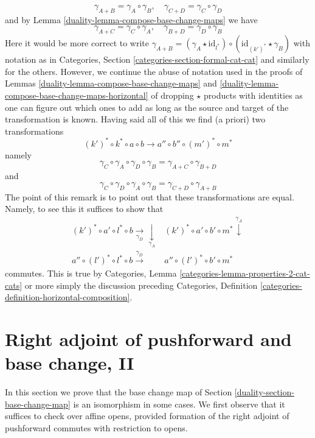 \begin{remark}
$$
\gamma_{A + B} = \gamma_A \circ \gamma_B, \quad
\gamma_{C + D} = \gamma_C \circ \gamma_D
$$
and by Lemma \ref{duality-lemma-compose-base-change-maps} we have
$$
\gamma_{A + C} = \gamma_C \circ \gamma_A, \quad
\gamma_{B + D} = \gamma_D \circ \gamma_B
$$
Here it would be more correct to write
$\gamma_{A + B} = (\gamma_A \star \text{id}_{l^*}) \circ
(\text{id}_{(k')^*} \star \gamma_B)$ with notation as in
Categories, Section \ref{categories-section-formal-cat-cat}
and similarly for the others. However, we continue the
abuse of notation used in the proofs of
Lemmas \ref{duality-lemma-compose-base-change-maps} and
\ref{duality-lemma-compose-base-change-maps-horizontal}
of dropping $\star$ products with identities as one can figure
out which ones to add as long as the source and target of the
transformation is known.
Having said all of this we find (a priori) two transformations
$$
(k')^* \circ k^* \circ a \circ b
\longrightarrow
a'' \circ b'' \circ (m')^* \circ m^*
$$
namely
$$
\gamma_C \circ \gamma_A \circ \gamma_D \circ \gamma_B =
\gamma_{A + C} \circ \gamma_{B + D}
$$
and
$$
\gamma_C \circ \gamma_D \circ \gamma_A \circ \gamma_B =
\gamma_{C + D} \circ \gamma_{A + B}
$$
The point of this remark is to point out that these transformations
are equal. Namely, to see this it suffices to show that
$$
\begin{array}{cc}(k')^* \circ a' \circ l^* \circ b \underset{\gamma_D}{\longrightarrow}\underset{\gamma_A}{\downarrow} & (k')^* \circ a' \circ b' \circ m^* \overset{\gamma_A}{\downarrow} \\ a'' \circ (l')^* \circ l^* \circ b \overset{\gamma_D}{\longrightarrow} & a'' \circ (l')^* \circ b' \circ m^*\end{array}
$$
commutes. This is true by
Categories, Lemma \ref{categories-lemma-properties-2-cat-cats}
or more simply the discussion preceding
Categories, Definition \ref{categories-definition-horizontal-composition}.
\end{remark}

\section{Right adjoint of pushforward and base change, II}
\label{duality-section-base-change-II}
In this section we prove that the base change map of
Section \ref{duality-section-base-change-map} is an isomorphism
in some cases. We first observe that it suffices to check
over affine opens, provided formation of the right adjoint
of pushforward commutes with restriction to opens.

